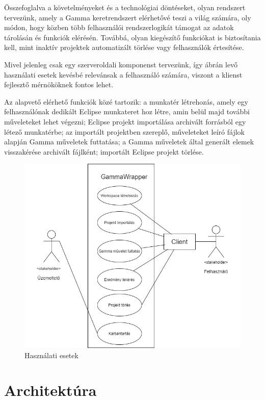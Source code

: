 Összefoglalva a követelményeket és a technológiai döntéseket, olyan rendszert tervezünk, amely a Gamma keretrendszert elérhetővé teszi a világ számára, oly módon, hogy közben több felhasználói rendszerlogikát támogat az adatok tárolásán és funkciók elérésén. Továbbá, olyan kiegészítő funkciókat is biztosítania kell, mint inaktív projektek automatizált törlése vagy felhasználók értesítése.


Mivel jelenleg csak egy szerveroldali komponenst tervezünk, így  ábrán levő használati esetek kevésbé relevánsak a felhasználó számára, viszont a klienst fejlesztő mérnököknek fontos lehet.

Az alapvető elérhető funkciók közé tartozik: a munkatér létrehozás, amely egy felhasználónak dedikált Eclipse munkateret hoz létre, amin belül majd további műveleteket lehet végezni; Eclipse projekt importálása archivált forrásból egy létező munkatérbe; az importált projektben szereplő, műveleteket leíró fájlok alapján Gamma műveletek futtatása; a Gamma műveletek által generált elemek visszakérése archivált fájlként; importált Eclipse projekt törlése.

\begin{figure}[!ht]
	\centering
	\includegraphics[width=\textwidth ,keepaspectratio]{figures/usecase.png}
	\caption{Használati esetek}
	\label{fig:usecase}
\end{figure}

\section{Architektúra}

